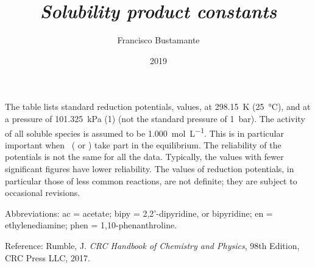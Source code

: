 \documentclass[a4paper, 10pt]{article}
\author{Francisco Bustamante}
\title{\textit{Solubility product constants}}
\date{2019}
\begin{document}
\footnotesize

\twocolumn

The table lists standard reduction potentials, \ElPot*{} values, at
\SI{298.15}{\kelvin} (\SI{25}{\celsius}), and at a pressure of
\SI{101.325}{\kilo\pascal} (\SI{1}{\atmosphere}) (not the standard pressure of
\SI{1}{\bar}). The activity of all soluble species is assumed to be
\SI{1.000}{\mole\per\liter}. This is in particular important when \pH \,
( or ) take part in the equilibrium. The reliability of the
potentials is not the same for all the data. Typically, the values with fewer
significant figures have lower reliability. The values of reduction potentials,
in particular those of less common reactions, are not definite; they are subject
to occasional revisions.

Abbreviations: ac = acetate; bipy = 2,2'-dipyridine, or bipyridine;
en = ethylenediamine; phen = 1,10-phenanthroline.

Reference: Rumble, J. \textit{CRC Handbook of Chemistry and Physics}, 98th
Edition, CRC Press LLC, 2017.

\end{document}

